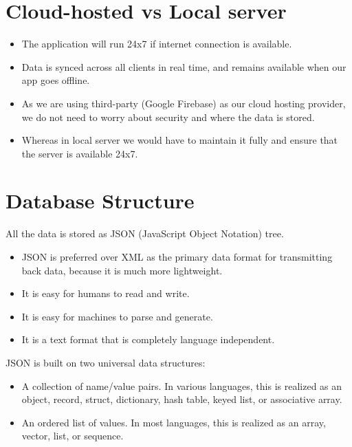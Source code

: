\documentclass{report}
\begin{document}
\section{Cloud-hosted vs Local server}
\begin{itemize}
\item The application will run 24x7 if internet connection is available.
\item Data is synced across all clients in real time, and remains available when our app goes offline.
\item As we are using third-party (Google Firebase) as our cloud hosting provider, we do not need to worry about security and  where the data is stored. 
\item Whereas in local server we would have to maintain it fully and ensure that the server is available 24x7.
\end{itemize}


\section{Database Structure}
All the data is stored as JSON (JavaScript Object Notation) tree.
\begin{itemize}
\item JSON is preferred over XML as the primary data format for transmitting back data, because it is much more lightweight.
\item It is easy for humans to read and write. 
\item It is easy for machines to parse and generate.
\item It is a text format that is completely language independent.\\
\end{itemize}

JSON is built on two universal data structures:
\begin{itemize}
\item A collection of name/value pairs. In various languages, this is realized as an object, record, struct, dictionary, hash table, keyed list, or associative array.
\item An ordered list of values. In most languages, this is realized as an array, vector, list, or sequence\cite{c1}.
\end{itemize}
\end{document}
